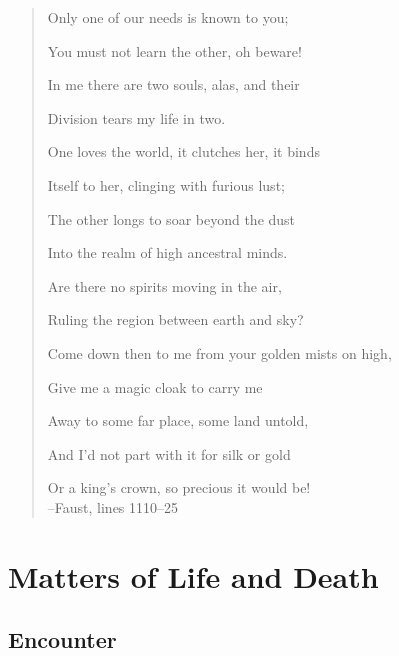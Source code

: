 \documentclass[oneside,11pt]{memoir} %
\begin{document}
\begin{quote}
    Only one of our needs is known to you;

    You must not learn the other, oh beware!
    
    In me there are two souls, alas, and their
    
    Division tears my life in two.
    
    One loves the world, it clutches her, it binds
    
    Itself to her, clinging with furious lust;
    
    The other longs to soar beyond the dust
    
    Into the realm of high ancestral minds.
    
    Are there no spirits moving in the air,
    
    Ruling the region between earth and sky?
    
    Come down then to me from your golden mists on high,
    
    Give me a magic cloak to carry me
    
    Away to some far place, some land untold,
    
    And I'd not part with it for silk or gold
    
    Or a king's crown, so precious it would be!\\
--Faust, lines 1110–25
\end{quote}


\part{Matters of Life and Death}


\chapter{Encounter}
\end{document}
